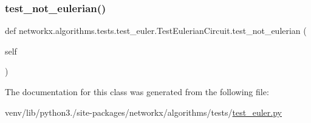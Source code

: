 \subsubsection{\texorpdfstring{test\+\_\+not\+\_\+eulerian()}{test\_not\_eulerian()}}
{\footnotesize\ttfamily def networkx.\+algorithms.\+tests.\+test\+\_\+euler.\+Test\+Eulerian\+Circuit.\+test\+\_\+not\+\_\+eulerian (\begin{DoxyParamCaption}\item[{}]{self }\end{DoxyParamCaption})}



The documentation for this class was generated from the following file\+:\begin{DoxyCompactItemize}
\item 
venv/lib/python3./site-\/packages/networkx/algorithms/tests/\hyperlink{test__euler_8py}{test\+\_\+euler.\+py}\end{DoxyCompactItemize}
